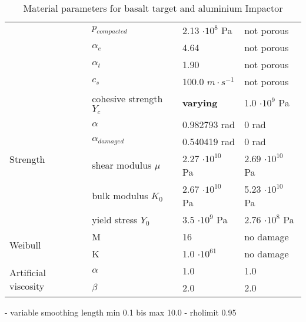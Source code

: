 \begin{table}
\begin{tabular}{ |l|l|l|l| }
                                              & $p_{compacted}$         & 2.13 $\cdot 10^8$ Pa             & not porous                       \\
                                              & $\alpha_e$              & 4.64                             & not porous                       \\
                                              & $\alpha_t$              & 1.90                             & not porous                       \\
                                              & $c_s$                   & 100.0 $m\cdot s^{-1}$            & not porous                       \\ \hline
        \multirow{6}{*}{Strength}             & cohesive strength $Y_c$ & \textbf{varying}                 & 1.0 $\cdot 10^9$ Pa              \\
                                              & $\alpha$                & 0.982793 rad                     & 0 rad                            \\
                                              & $\alpha_{damaged}$      & 0.540419 rad                     & 0 rad                            \\
                                              & shear modulus $\mu$     & 2.27 $\cdot 10^{10}$ Pa          & 2.69 $\cdot 10^{10}$ Pa          \\
                                              & bulk modulus $K_0$      & 2.67 $\cdot 10^{10}$ Pa          & 5.23 $\cdot 10^{10}$ Pa          \\
                                              & yield stress $Y_0$      & 3.5 $\cdot 10^9$ Pa              & 2.76 $\cdot 10^8$ Pa             \\ \hline
        \multirow{2}{*}{Weibull}              & M                       & 16                               & no damage                        \\
                                              & K                       & 1.0 $\cdot 10^{61}$              & no damage                        \\ \hline
        \multirow{2}{*}{Artificial viscosity} & $\alpha$                & 1.0                              & 1.0                              \\
                                              & $\beta$                 & 2.0                              & 2.0                              \\ \hline
        \hline
    \end{tabular}
    \caption{Material parameters for basalt target and aluminium Impactor}
    \label{fig:material_parameters}
\end{table}

- variable smoothing length min 0.1 bis max 10.0
- rholimit 0.95